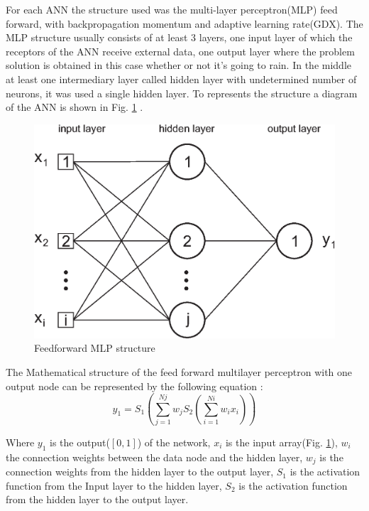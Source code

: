 For each ANN the structure used was the multi-layer perceptron(MLP) feed forward, with backpropagation momentum and adaptive learning rate(GDX). The MLP structure usually consists of at least 3 layers, one input layer of which the receptors of the ANN receive external data, one output layer where the problem solution is obtained in this case whether or not it's going to rain. In the middle at least one intermediary layer called hidden layer with undetermined number of neurons, it was used a single hidden layer. To represents the structure a diagram of the ANN is shown in Fig. \ref{img:figure2} .

\begin{figure}[htb!]
 \centering
 \includegraphics[scale=0.5]{capitulo_2/diagram_ann}
 \caption{Feedforward MLP structure}
 \label{img:figure2}
\end{figure}
The Mathematical structure of the feed forward multilayer perceptron with one output node can be represented by the following equation \cite{luk2000study}:
\begin{equation}
 \label{eq:solve15}
 y_1 = S_1(\sum\limits_{j=1}^{Nj} w_j S_2(\sum\limits_{i=1}^{Ni} w_i x_i))
\end{equation}

Where $y_1$ is the output($[0, 1]$) of the network, $x_i$ is the input array(Fig. \ref{img:figure2}), $w_i$ the connection weights between the data node and the hidden layer, $w_j$ is the connection weights from the hidden layer to the output layer, $S_1$ is the activation function from the Input layer to the hidden layer, $S_2$ is the activation function from the hidden layer to the output layer.

